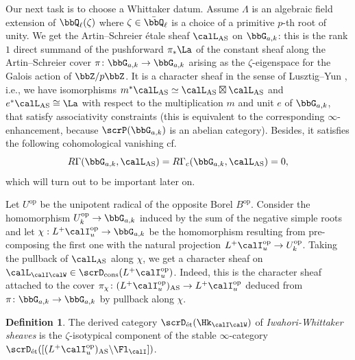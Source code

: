 \documentclass[10pt, reqno]{amsart}
\theoremstyle{plain}
\theoremstyle{definition}
\newtheorem{definition}[theorem]{Definition}
\numberwithin{equation}{section}
\begin{document}
Our next task is to choose a Whittaker datum. Assume $\Lambda$ is an algebraic field extension of $\bbQ_\ell(\zeta)$ where $\zeta \in \bar \bbQ_\ell$ is a choice of a primitive $p$-th root of unity. We get the Artin--Schreier étale sheaf $\calL_{\mathrm{AS}}$ on $\bbG_{a,k}$: this is the rank $1$ direct summand of the pushforward $\pi_*\La$ of the constant sheaf along the Artin--Schreier cover $\pi\colon \bbG_{a,k} \to \bbG_{a,k}$ arising as the $\zeta$-eigenspace for the Galois action of $\bbZ/p\bbZ$. It is a character sheaf in the sense of Lusztig--Yun \cite{LY20}, i.e., we have isomorphisms $m^*\calL_{\mathrm{AS}} \simeq \calL_{\mathrm{AS}}\boxtimes \calL_{\mathrm{AS}}$ and $e^*\calL_{\mathrm{AS}}\cong \La$ with respect to the multiplication $m$ and unit $e$ of $\bbG_{a,k}$, that satisfy associativity constraints (this is equivalent to the corresponding $\infty$-enhancement, because $\scrP(\bbG_{a,k})$ is an abelian category). 
Besides, it satisfies the following cohomological vanishing cf.\ \cite[Theorem 2.7]{Del77} \begin{equation}
	R\Gamma(\bbG_{a,k}, \calL_{\mathrm{AS}})=R\Gamma_c(\bbG_{a,k}, \calL_{\mathrm{AS}})=0,
\end{equation}
which will turn out to be important later on.

Let $U^{\mathrm{op}}$ be the unipotent radical of the opposite Borel $B^{\mathrm{op}}$. Consider the homomorphism $U_k^{\mathrm{op}} \to \bbG_{a,k}$ induced by the 
sum of the negative simple roots and let $\chi: L^+\calI^{\mathrm{op}}_u \to \bbG_{a,k}$ be the homomorphism resulting from pre-composing the first one with the natural projection $L^+\calI^{\mathrm{op}}_u \to U_k^{\mathrm{op}}$. Taking the pullback of $\calL_{\mathrm{AS}}$ along $\chi$, we get a character sheaf on $\calL_{\calI\calW} \in \scrD_{\mathrm{cons}}(L^+\calI_u^{\mathrm{op}})$. Indeed, this is the character sheaf attached to the cover $\pi_\chi \colon (L^+\calI_u^{\mathrm{op}})_{\mathrm{AS}} \to L^+\calI_u^{\mathrm{op}}$ deduced from $\pi\colon \bbG_{a,k} \to \bbG_{a,k}$ by pullback along $\chi$.

\begin{definition}
	The derived category $\scrD_{\mathrm{\acute{e}t}}(\Hk_{\calI\calW})$ of \textit{Iwahori-Whittaker sheaves} is the $\zeta$-isotypical component of the stable $\infty$-category $\scrD_{\mathrm{\acute{e}t}}([(L^+\calI_u^{\mathrm{op}})_{\mathrm{AS}}\backslash \Fl_{\calI}])$.
\end{definition}
\end{document}
